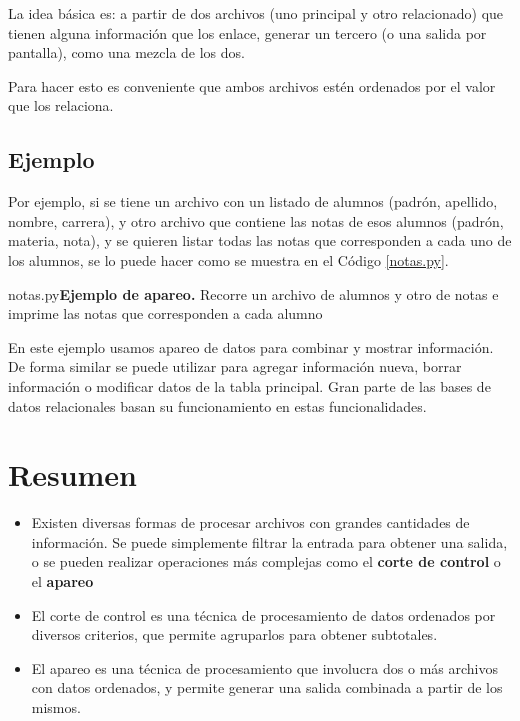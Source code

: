 La idea básica es: a partir de dos archivos (uno principal y otro
relacionado) que tienen alguna información que los enlace, generar un
tercero (o una salida por pantalla), como una mezcla de los dos.

Para hacer esto es conveniente que ambos archivos estén ordenados por el valor
que los relaciona.

\subsection*{Ejemplo}

Por ejemplo, si se tiene un archivo con un listado de alumnos (padrón,
apellido, nombre, carrera), y otro archivo que contiene las notas de esos
alumnos (padrón, materia, nota), y se quieren listar todas las notas que
corresponden a cada uno de los alumnos, se lo puede hacer como se muestra en el
Código \ref{notas.py}.

\begin{codigo}{notas.py}{{\bf Ejemplo de apareo.} Recorre un archivo de alumnos
	y otro de notas e imprime las notas que corresponden a cada alumno}
\label{notas.py}

\end{codigo}

En este ejemplo usamos apareo de datos para combinar y mostrar
información. De forma similar se puede utilizar para agregar información nueva,
borrar información o modificar datos de la tabla principal. Gran parte de las
bases de datos relacionales basan su funcionamiento en estas funcionalidades.

\section{Resumen}

\begin{itemize}

\item Existen diversas formas de procesar archivos con grandes cantidades de
	información. Se puede simplemente filtrar la entrada para obtener una
	salida, o se pueden realizar operaciones más complejas como el {\bf corte
	de control} o el {\bf apareo}

\item El corte de control es una técnica de procesamiento de datos
ordenados por diversos criterios, que permite agruparlos para obtener
subtotales.

\item El apareo es una técnica de procesamiento que involucra dos o más
	archivos con datos ordenados, y permite generar una salida combinada a
	partir de los mismos.

\end{itemize}

